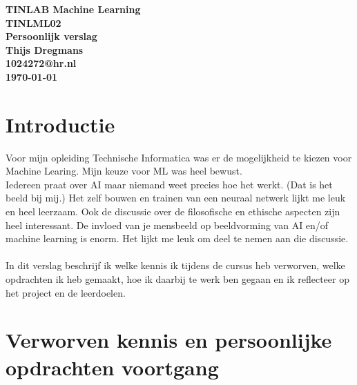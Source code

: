 \documentclass{article} %
\begin{document}
    \sffamily
    \begin{titlepage}
        \centering
        \vfill
        {\bfseries\Huge
            TINLAB Machine Learning \\
            \vskip1cm
        }
        {\bfseries\Large
            TINLML02 \\
            \vskip4cm
        }
        {\bfseries\Huge
            Persoonlijk verslag \\
            \vskip1cm
        }
        {\bfseries\Large
            Thijs Dregmans\\
        }
        {\bfseries\normalsize
            1024272@hr.nl\\
            \vskip1cm
            \today\\
        }    
        \vfill
        \vfill
        \vfill
    \end{titlepage}
    \newpage

    \tableofcontents
    \newpage

    \section*{Introductie}

    Voor mijn opleiding Technische Informatica was er de mogelijkheid te kiezen voor Machine Learing. Mijn keuze voor ML was heel bewust. \\
    Iedereen praat over AI maar niemand weet precies hoe het werkt. (Dat is het beeld bij mij.) Het zelf bouwen en trainen van een neuraal netwerk lijkt me leuk en heel leerzaam. Ook de discussie over de filosofische en ethische aspecten zijn heel interessant. De invloed van je mensbeeld op beeldvorming van AI en/of machine learning is enorm. Het lijkt me leuk om deel te nemen aan die discussie. \\ \\
    In dit verslag beschrijf ik welke kennis ik tijdens de cursus heb verworven, welke opdrachten ik heb gemaakt, hoe ik daarbij te werk ben gegaan en ik reflecteer op het project en de leerdoelen.

    \newpage

    \section{Verworven kennis en persoonlijke opdrachten voortgang}
\end{document}
